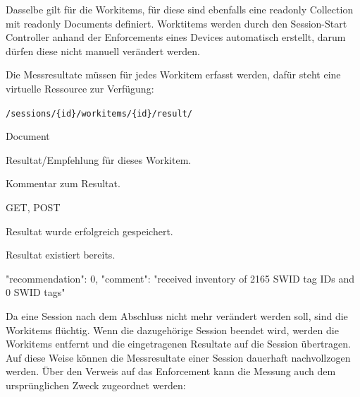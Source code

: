 Dasselbe gilt für die Workitems, für diese sind ebenfalls eine readonly
Collection mit readonly Documents definiert. Worktitems werden durch den
Session-Start Controller anhand der Enforcements eines Devices automatisch
erstellt, darum dürfen diese nicht manuell verändert werden.

Die Messresultate müssen für jedes Workitem erfasst werden, dafür steht eine
virtuelle Ressource zur Verfügung:

\begin{mdframed}[style=def]
\begin{description*}
	\item[URI Path] \texttt{/sessions/\{id\}/workitems/\{id\}/result/}
	\item[Archetype] Document
	\item[Request Parameter] \hfill
	\begin{description*}
		\item[\texttt{recommendation}] Resultat/Empfehlung für dieses Workitem.
		\item[\texttt{comment}] Kommentar zum Resultat.
	\end{description*}
	\item[Methods] GET, POST
	\item[Response Statuscodes] \hfill
		\begin{description*}
			\item[201 Created] Resultat wurde erfolgreich gespeichert.
			\item[409 Conflict] Resultat existiert bereits.
		\end{description*}
	\item[JSON Format Response] \hfill
\begin{jsoncode}
{
	"recommendation": 0,
	"comment": "received inventory of 2165 SWID tag IDs and 0 SWID tags"
}
\end{jsoncode}
\end{description*}
\end{mdframed}

Da eine Session nach dem Abschluss nicht mehr verändert werden soll, sind die
Workitems flüchtig. Wenn die dazugehörige Session beendet wird, werden die
Workitems entfernt und die eingetragenen Resultate auf die Session übertragen.
Auf diese Weise können die Messresultate einer Session dauerhaft nachvollzogen
werden. Über den Verweis auf das Enforcement kann die Messung auch dem
ursprünglichen Zweck zugeordnet werden:

